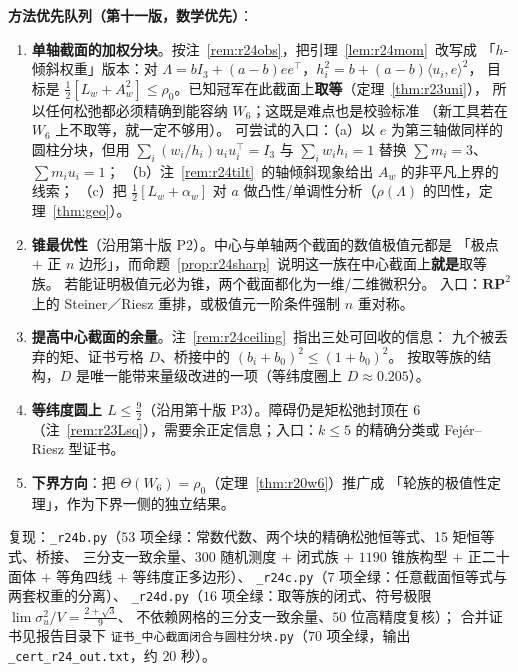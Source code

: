 \documentclass[UTF8,11pt]{ctexart}
\theoremstyle{definition}
\newcommand{\Lam}{\Lambda}
\begin{document}
\textbf{方法优先队列（第十一版，数学优先）}：
\begin{enumerate}\itemsep2pt
\item[\textbf{P1}] \textbf{单轴截面的加权分块}。按注~\ref{rem:r24obs}，把引理~\ref{lem:r24mom}~改写成
「$h$-倾斜权重」版本：对 $\Lam=bI_3+(a-b)ee^\top$，$h_i^2=b+(a-b)\langle u_i,e\rangle^2$，
目标是 $\frac12[L_w+A_w^2]\le\rho_0$。已知冠军在此截面上\textbf{取等}（定理~\ref{thm:r23uni}），
所以任何松弛都必须精确到能容纳 $W_6$；这既是难点也是校验标准
（新工具若在 $W_6$ 上不取等，就一定不够用）。
可尝试的入口：（a）以 $e$ 为第三轴做同样的圆柱分块，但用
$\sum_i(w_i/h_i)u_iu_i^\top=I_3$ 与 $\sum_iw_ih_i=1$ 替换 $\sum m_i=3$、$\sum m_iu_i=1$；
（b）注~\ref{rem:r24tilt}~的轴倾斜现象给出 $A_w$ 的非平凡上界的线索；
（c）把 $\frac12[L_w+\alpha_w]$ 对 $a$ 做凸性/单调性分析（$\rho(\Lam)$ 的凹性，定理~\ref{thm:geo}）。
\item[\textbf{P2}] \textbf{锥最优性}（沿用第十版 P2）。中心与单轴两个截面的数值极值元都是
「极点 $+$ 正 $n$ 边形」，而命题~\ref{prop:r24sharp}~说明这一族在中心截面上\textbf{就是}取等族。
若能证明极值元必为锥，两个截面都化为一维/二维微积分。
入口：$\mathbf{RP}^2$ 上的 Steiner／Riesz 重排，或极值元一阶条件强制 $n$ 重对称。
\item[\textbf{P3}] \textbf{提高中心截面的余量}。注~\ref{rem:r24ceiling}~指出三处可回收的信息：
九个被丢弃的矩、证书亏格 $D$、桥接中的 $(b_i+b_0)^2\le(1+b_0)^2$。
按取等族的结构，$D$ 是唯一能带来量级改进的一项（等纬度圈上 $D\approx0.205$）。
\item[\textbf{P4}] \textbf{等纬度圆上 $L\le\frac92$}（沿用第十版 P3）。障碍仍是矩松弛封顶在 $6$
（注~\ref{rem:r23Lsq}），需要余正定信息；入口：$k\le5$ 的精确分类或 Fej\'er--Riesz 型证书。
\item[\textbf{副}] \textbf{下界方向}：把 $\Theta(W_6)=\rho_0$（定理~\ref{thm:r20w6}）推广成
「轮族的极值性定理」，作为下界一侧的独立结果。
\end{enumerate}

复现：\texttt{\_r24b.py}（$53$ 项全绿：常数代数、两个块的精确松弛恒等式、15 矩恒等式、桥接、
三分支一致余量、$300$ 随机测度 $+$ 闭式族 $+$ $1190$ 锥族构型 $+$ 正二十面体 $+$ 等角四线 $+$ 等纬度正多边形）、
\texttt{\_r24c.py}（$7$ 项全绿：任意截面恒等式与两套权重的分离）、
\texttt{\_r24d.py}（$16$ 项全绿：取等族的闭式、符号极限 $\lim\sigma_u^2/V=\frac{2+\sqrt3}9$、
不依赖网格的三分支一致余量、$50$ 位高精度复核）；
合并证书见报告目录下 \texttt{证书\_中心截面闭合与圆柱分块.py}（$70$ 项全绿，输出 \texttt{\_cert\_r24\_out.txt}，约 $20$ 秒）。
\end{document}
